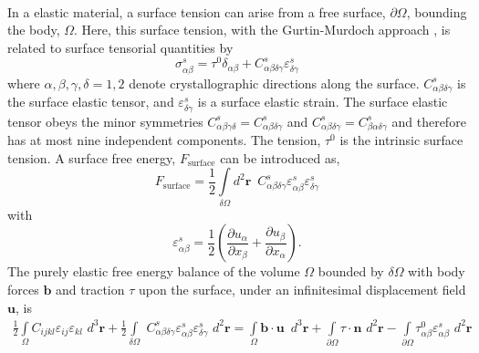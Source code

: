 \documentclass[22pt]{article} %
\begin{document}
\paragraph{}In a elastic material, a surface tension can arise from a free surface, $\partial \Omega$, bounding the body, $\Omega$.
%
Here, this surface tension, with the Gurtin-Murdoch approach \cite{Morton1975},  is related to surface tensorial quantities by
%
\begin{equation}\tag{3.1}
\sigma_{\alpha \beta}^s = \tau^0 \delta_{\alpha \beta} + C_{\alpha \beta \delta \gamma}^s \varepsilon_{\delta \gamma}^s
\end{equation}
%
where $\alpha, \beta, \gamma, \delta = 1,2$ denote crystallographic directions along the surface.
%
$C_{\alpha \beta \delta \gamma}^s$ is the surface elastic tensor, and $\varepsilon_{\delta \gamma}^s$ is a surface elastic strain. The surface elastic tensor obeys the minor symmetries $C_{\alpha \beta \gamma \delta}^s = C_{\alpha \beta \delta \gamma }^s$ and $C_{\alpha \beta \delta \gamma}^s = C_{\beta \alpha \delta \gamma }^s$ and therefore has at most nine independent components.
%
The tension, $\tau^0$ is the intrinsic surface tension.
%
A surface free energy, $F_\mathrm{surface}$ can be introduced as,
%
\begin{equation}\tag{3.5}
F_\mathrm{surface} = \frac{1}{2} \int\limits_{\delta \Omega} d^2 \textbf{r} \,\,\, C_{\alpha \beta \delta \gamma }^s \varepsilon_{\alpha \beta}^s \varepsilon_{\delta \gamma}^s 
\end{equation}
%
with
%
\begin{equation}\tag{3.6}
 \varepsilon_{\alpha \beta}^s = \frac{1}{2} \left(\frac{\partial u_\alpha}{\partial x_\beta} + \frac{\partial u_\beta}{\partial x_\alpha} \right).
\end{equation}
%
The purely elastic free energy balance of the volume $\Omega$ bounded by $\delta \Omega$ with body forces $\textbf{b}$ and traction $\tau$ upon the surface, under an infinitesimal displacement field $\textbf{u}$, is
%
\begin{align}\tag{3.7}
 \frac{1}{2} \int\limits_\Omega C_{ijkl} \varepsilon_{ij} \varepsilon_{kl} \,\,d^3 \textbf{r} + \frac{1}{2} \int\limits_{\delta \Omega} \,\, C_{\alpha \beta \delta \gamma}^s \varepsilon_{\alpha \beta}^s \varepsilon_{\delta \gamma}^s\,\, d^2 \textbf{r} = \int\limits_\Omega \textbf{b} \cdot \textbf{u} \,\,\,d^3 \textbf{r} + \int\limits_{\partial \Omega} \tau \cdot \mathbf{\hat{n}} \,\,d^2 \textbf{r} - \int\limits_{\partial \Omega} \tau^0_{\alpha \beta} \varepsilon_{\alpha \beta}^s \,\,d^2 \textbf{r} \\ \nonumber
\end{align}
\end{document}
